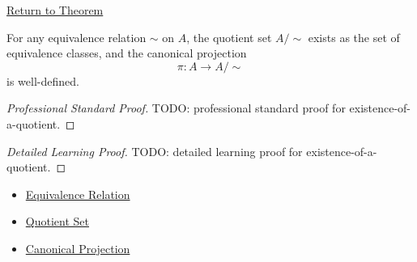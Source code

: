 \newpage
{}
\label{prf:existence-of-a-quotient}

\begin{remark*}[Return]
\hyperref[thm:existence-of-a-quotient]{Return to Theorem}
\end{remark*}

\begin{theorem*}
For any equivalence relation $\sim$ on $A$, the quotient set $A/{\sim}$ exists
as the set of equivalence classes, and the canonical projection
\[
\pi:A\to A/{\sim}
\]
is well-defined.
\end{theorem*}

\begin{proof}[Professional Standard Proof]
\LRAProofBodyStart
TODO: professional standard proof for existence-of-a-quotient.
\end{proof}

\begin{proof}[Detailed Learning Proof]
\LRAProofBodyStart
TODO: detailed learning proof for existence-of-a-quotient.
\end{proof}

\begin{remark*}
\end{remark*}

\begin{dependencies}
\begin{itemize}
  \item \hyperref[def:equivalence-relation]{Equivalence Relation}
  \item \hyperref[def:quotient-set]{Quotient Set}
  \item \hyperref[def:canonical-projection]{Canonical Projection}
\end{itemize}
\end{dependencies}

\clearpage

